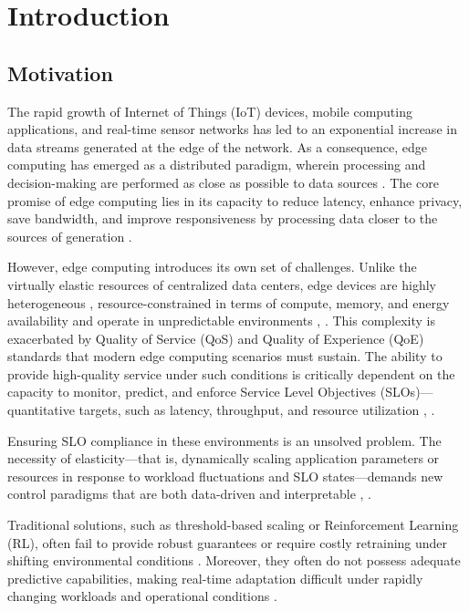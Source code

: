 \chapter{Introduction}

\section{Motivation}
The rapid growth of Internet of Things (IoT) devices, mobile computing applications, and real-time sensor networks has led to an exponential increase in data streams generated at the edge of the network. As a consequence, edge computing has emerged as a distributed paradigm, wherein processing and decision-making are performed as close as possible to data sources \cite{deng_edge_2020}. The core promise of edge computing lies in its capacity to
reduce latency, enhance privacy, save bandwidth, and improve responsiveness by processing data closer to the sources of generation \cite{deng_edge_2020}. 

However, edge computing introduces its own set of challenges. Unlike the virtually
elastic resources of centralized data centers, edge devices are highly heterogeneous \cite{furst_elastic_2018},
resource-constrained in terms of compute, memory, and energy availability and operate in unpredictable environments \cite{sedlak_active_2024}, \cite{danilenka_adaptive_2025}. This complexity is exacerbated by Quality of Service (QoS) and Quality of Experience (QoE) standards that modern edge computing scenarios must sustain. The ability to provide high-quality service under such conditions is critically dependent on the capacity to monitor, predict, and enforce Service Level Objectives (SLOs)—quantitative targets, such as latency, throughput, and resource utilization \cite{sedlak_diffusing_2024}, \cite{nastic_sloc_2020}. 

Ensuring SLO compliance in these environments is an unsolved problem. The necessity of elasticity—that is, dynamically scaling application parameters or resources in response to workload fluctuations and SLO states—demands new control paradigms that are both data-driven and interpretable \cite{lapkovskis_benchmarking_2025}, \cite{dias_de_assuncao_distributed_2018}.

Traditional solutions, such as threshold-based scaling or Reinforcement Learning (RL), often fail to provide robust guarantees or require costly retraining under shifting environmental conditions \cite{xu_coscal_2022}. Moreover, they often do not possess adequate predictive capabilities, making real-time adaptation difficult under rapidly changing workloads and operational conditions \cite{oquinn_environment-aware_2025}.

